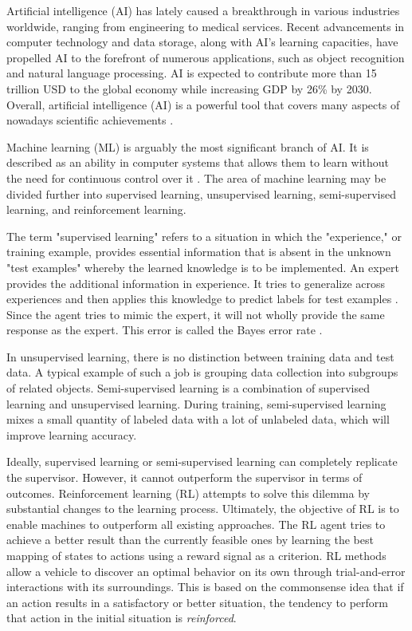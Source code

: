 Artificial intelligence (AI) has lately caused a breakthrough in various industries worldwide, ranging from engineering to medical services. Recent advancements in computer technology and data storage, along with AI's learning capacities, have propelled AI to the forefront of numerous applications, such as object recognition and natural language processing. AI is expected to contribute more than 15 trillion USD to the global economy while increasing GDP by 26\% by 2030. Overall, artificial intelligence (AI) is a powerful tool that covers many aspects of nowadays scientific achievements \cite{anand2019s}. 

Machine learning (ML) is arguably the most significant branch of AI. It is described as an ability in computer systems that allows them to learn without the need for continuous control over it \cite{pandey2021machine}. The area of machine learning may be divided further into supervised learning, unsupervised learning, semi-supervised learning, and reinforcement learning. 

The term "supervised learning" refers to a situation in which the "experience," or training example, provides essential information that is absent in the unknown "test examples" whereby the learned knowledge is to be implemented. An expert provides the additional information in experience. It tries to generalize across experiences and then applies this knowledge to predict labels for test examples \cite{shalev2014understanding}. Since the agent tries to mimic the expert, it will not wholly provide the same response as the expert. This error is called the Bayes error rate \cite{ng2017machine}.  

In unsupervised learning, there is no distinction between training data and test data. A typical example of such a job is grouping data collection into subgroups of related objects. Semi-supervised learning is a combination of supervised learning and unsupervised learning. During training, semi-supervised learning mixes a small quantity of labeled data with a lot of unlabeled data, which will improve learning accuracy. 

Ideally, supervised learning or semi-supervised learning can completely replicate the supervisor. However, it cannot outperform the supervisor in terms of outcomes. Reinforcement learning (RL) attempts to solve this dilemma by substantial changes to the learning process. Ultimately, the objective of RL is to enable machines to outperform all existing approaches. The RL agent tries to achieve a better result than the currently feasible ones by learning the best mapping of states to actions using a reward signal as a criterion. RL methods allow a vehicle to discover an optimal behavior on its own through trial-and-error interactions with its surroundings. This is based on the commonsense idea that if an action results in a satisfactory or better situation, the tendency to perform that action in the initial situation is \textit{reinforced}. 

